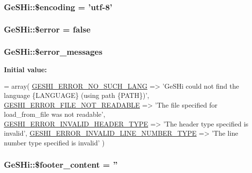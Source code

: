 \hypertarget{class_ge_s_hi_a3b03e6a3b66127948eaa2a5d42889d69}{
\subsubsection[{\$encoding}]{\setlength{\rightskip}{0pt plus 5cm}Ge\-S\-Hi\-::\$encoding = 'utf-\/8'}}\label{class_ge_s_hi_a3b03e6a3b66127948eaa2a5d42889d69}
\hypertarget{class_ge_s_hi_a14f9678079f0bf885eb9a9a4864d4ff3}{
\subsubsection[{\$error}]{\setlength{\rightskip}{0pt plus 5cm}Ge\-S\-Hi\-::\$error = false}}\label{class_ge_s_hi_a14f9678079f0bf885eb9a9a4864d4ff3}
\hypertarget{class_ge_s_hi_a083d358bd822eddb0a29571fbdb0706e}{
\subsubsection[{\$error\-\_\-messages}]{\setlength{\rightskip}{0pt plus 5cm}Ge\-S\-Hi\-::\$error\-\_\-messages}}\label{class_ge_s_hi_a083d358bd822eddb0a29571fbdb0706e}
{\bfseries Initial value\-:}
\begin{DoxyCode}
= array(
        \hyperlink{geshi_8php_ade94b7289ca209f2232ba54fbed45d7a}{GESHI\_ERROR\_NO\_SUCH\_LANG} => \textcolor{stringliteral}{'GeSHi could not
       find the language \{LANGUAGE\} (using path \{PATH\})'},
        \hyperlink{geshi_8php_ab26c550d73280280d4cad465b245102f}{GESHI\_ERROR\_FILE\_NOT\_READABLE} => \textcolor{stringliteral}{'The file
       specified for load\_from\_file was not readable'},
        \hyperlink{geshi_8php_a532ae6b6ae831f9d4a53dd325eafb799}{GESHI\_ERROR\_INVALID\_HEADER\_TYPE} => \textcolor{stringliteral}{'The
       header type specified is invalid'},
        \hyperlink{geshi_8php_ade87771c2127b62786b36d1c206d5eac}{GESHI\_ERROR\_INVALID\_LINE\_NUMBER\_TYPE}
       => \textcolor{stringliteral}{'The line number type specified is invalid'}
    )
\end{DoxyCode}
\hypertarget{class_ge_s_hi_a0abc101255ddc2fc8ff42f2d3608567e}{
\subsubsection[{\$footer\-\_\-content}]{\setlength{\rightskip}{0pt plus 5cm}Ge\-S\-Hi\-::\$footer\-\_\-content = ''}}\label{class_ge_s_hi_a0abc101255ddc2fc8ff42f2d3608567e}
